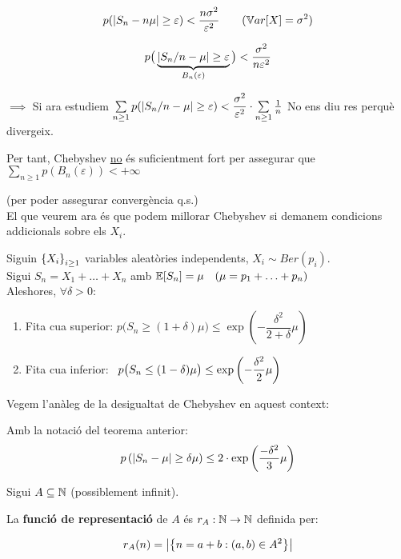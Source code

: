 \[
  p(\left\vert S_n - n\mu \right\vert \geq \varepsilon) < \frac{n\sigma^2}{\varepsilon^2} \qquad (\mathbb{V} ar[X] = \sigma^2)
\]

\[
  p\big(\underbrace{\left\vert S_n/n - \mu \right\vert \geq \varepsilon}_{B_n(\varepsilon)}\big) < \frac{\sigma^2}{n\varepsilon^2}
\]

$\implies$ Si ara estudiem $\sum\limits_{n\geq1}p(\left\vert S_n/n - \mu \right\vert \geq \varepsilon) < 
\dfrac{\sigma^2}{\varepsilon^2}\cdot \sum\limits_{n\geq1} \frac{1}{n}$ No ens diu res perquè divergeix.

\newpage

Per tant, Chebyshev \underline{no} és suficientment fort per assegurar que $\sum\limits_{n\geq1}p(B_n(\varepsilon)) < +\infty$

(per poder assegurar convergència q.s.) \\

El que veurem ara és que podem millorar Chebyshev si demanem condicions addicionals sobre els $X_i$.

\begin{thm}
  Siguin $\left\{X_i\right\}_{i\geq1}$ variables aleatòries independents, $X_i \sim Ber(p_i)$. \\
  
  Sigui $S_n = X_1 + \ldots + X_n$ amb $\mathbb{E}[S_n] = \mu \quad (\mu = p_1 + \ldots + p_n)$ \\
  
  Aleshores, $\forall \delta>0$:
  \begin{enumerate}
      \item Fita cua superior: $p\big(S_n \geq (1+\delta)\mu\big) \leq \exp\left(-\dfrac{\delta^2}{2+\delta}\mu\right)$
      \item Fita cua inferior: $\hspace{0.18cm}p\big(S_n\leq(1-\delta)\mu \big) \leq \exp\left(-\dfrac{\delta^2}{2}\mu\right)$
  \end{enumerate}
\end{thm}

Vegem l'anàleg de la desigualtat de Chebyshev en aquest context:

\begin{col}
  Amb la notació del teorema anterior:
  \[
    p\left(\left\vert S_n - \mu \right\vert\geq\delta\mu\right) \leq 2\cdot \exp\left(\dfrac{-\delta^2}{3}\mu \right)
  \]
\end{col}

\begin{defi}
  Sigui $A\subseteq \mathbb{N}$ (possiblement infinit). 
  
  La \textbf{funció de representació} de $A$ és $r_A:\mathbb{N} \to \mathbb{N}$ definida per:
  
  \[
    r_A(n) = \left\vert \left\{n=a+b : (a,b) \in A^2\right\} \right\vert
  \]
\end{defi}

